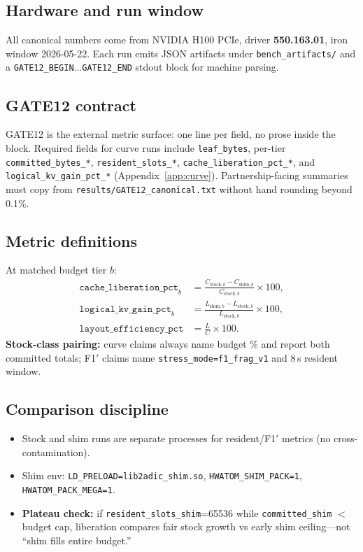 \documentclass[11pt]{article}
\begin{document}
\subsection{Hardware and run window}
All canonical numbers come from NVIDIA H100 PCIe, driver \textbf{550.163.01}, iron window 2026-05-22.
Each run emits JSON artifacts under \texttt{bench\_artifacts/} and a \texttt{GATE12\_BEGIN}...\texttt{GATE12\_END} stdout block for machine parsing.

\subsection{GATE12 contract}
GATE12 is the external metric surface: one line per field, no prose inside the block.
Required fields for curve runs include \texttt{leaf\_bytes}, per-tier \texttt{committed\_bytes\_*}, \texttt{resident\_slots\_*}, \texttt{cache\_liberation\_pct\_*}, and \texttt{logical\_kv\_gain\_pct\_*} (Appendix~\ref{app:curve}).
Partnership-facing summaries must copy from \texttt{results/GATE12\_canonical.txt} without hand rounding beyond 0.1\%.

\subsection{Metric definitions}
At matched budget tier $b$:
\begin{align*}
\texttt{cache\_liberation\_pct}_b &= \frac{C_{\mathrm{stock},b}-C_{\mathrm{shim},b}}{C_{\mathrm{stock},b}}\times 100, \\
\texttt{logical\_kv\_gain\_pct}_b &= \frac{L_{\mathrm{shim},b}-L_{\mathrm{stock},b}}{L_{\mathrm{stock},b}}\times 100, \\
\texttt{layout\_efficiency\_pct} &= \frac{L}{C}\times 100.
\end{align*}
\textbf{Stock-class pairing:} curve claims always name budget \% and report both committed totals; F1$'$ claims name \texttt{stress\_mode=f1\_frag\_v1} and 8\,s resident window.

\subsection{Comparison discipline}
\begin{itemize}
  \item Stock and shim runs are separate processes for resident/F1$'$ metrics (no cross-contamination).
  \item Shim env: \texttt{LD\_PRELOAD=lib2adic\_shim.so}, \texttt{HWATOM\_SHIM\_PACK=1}, \texttt{HWATOM\_PACK\_MEGA=1}.
  \item \textbf{Plateau check:} if \texttt{resident\_slots\_shim}=65536 while \texttt{committed\_shim} $<$ budget cap, liberation compares fair stock growth vs early shim ceiling---not ``shim fills entire budget.''
\end{itemize}
\end{document}
